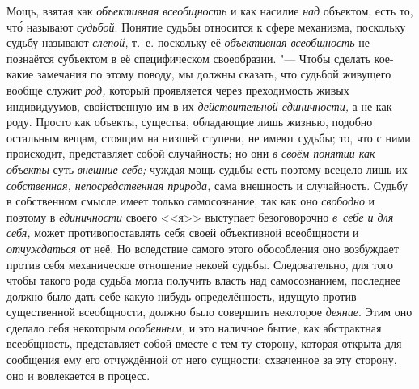Мощь, взятая как
{\em объективная всеобщность}
и как насилие {\em над}
объектом, есть то, чт\'{о} называют
{\em судьбой}. Понятие
судьбы относится к сфере механизма, поскольку судьбу называют
{\em слепой,} т.~е.
поскольку её {\em объективная
всеобщность} не познаётся субъектом в её специфическом
своеобразии. "--- Чтобы сделать кое-какие замечания
по этому поводу, мы должны сказать, что судьбой живущего вообще служит
{\em род,} который
проявляется через преходимость живых индивидуумов, свойственную им в их
{\em действительной единичности,}
а не как роду. Просто как объекты, существа, обладающие лишь
жизнью, подобно остальным вещам, стоящим на низшей ступени, не имеют
судьбы; то, что с ними происходит, представляет собой случайность; но они
{\em в своём понятии как объекты}
суть {\em внешние себе;}
чуждая мощь судьбы есть поэтому всецело лишь их
{\em собственная, непосредственная
природа,} сама внешность и случайность. Судьбу в собственном
смысле имеет только самосознание, так как оно
{\em свободно} и поэтому
в {\em единичности}
своего <<я>> выступает безоговорочно
{\em в~себе и для себя,}
может противопоставлять себя своей объективной всеобщности и
{\em отчуждаться} от неё.
Но вследствие самого этого обособления оно возбуждает против
себя механическое отношение некоей судьбы. Следовательно, для того чтобы
такого рода судьба могла получить власть над самосознанием, последнее
должно было дать себе какую-нибудь определённость, идущую против
существенной всеобщности, должно было совершить некоторое
{\em деяние}. Этим оно
сделало себя некоторым {\em особенным,}
и это наличное бытие, как абстрактная всеобщность,
представляет собой вместе с тем ту сторону, которая открыта для сообщения
ему его отчуждённой от него сущности; схваченное за эту сторону, оно и
вовлекается в
процесс.
